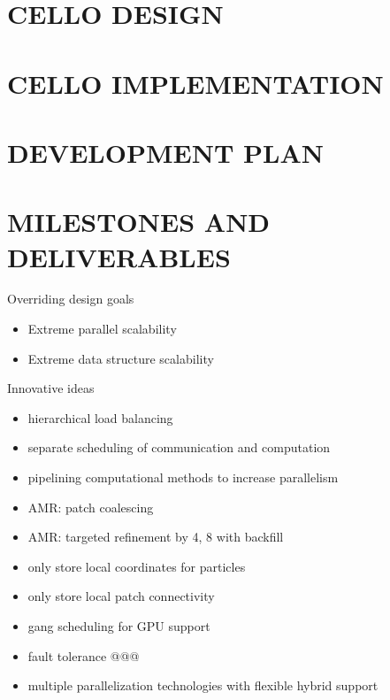 \documentclass[14pt,letter]{article}
\begin{document}
\section{CELLO DESIGN} \label{s:design}

\section{CELLO IMPLEMENTATION} \label{s:implementation}

%   
\section{DEVELOPMENT PLAN} \label{s:plan}

% 
\section{MILESTONES AND DELIVERABLES} \label{s:milestones}
%
%   

Overriding design goals
\begin{itemize}
\item Extreme parallel scalability
\item Extreme data structure scalability
\end{itemize}

Innovative ideas
\begin{itemize}
\item hierarchical load balancing
\item separate scheduling of communication and computation
\item pipelining computational methods to increase parallelism
\item AMR: patch coalescing
\item AMR: targeted refinement by 4, 8 with backfill
\item only store local coordinates for particles
\item only store local patch connectivity
\item gang scheduling for GPU support
\item fault tolerance @@@
\item multiple parallelization technologies with flexible hybrid support
\end{itemize}
\end{document}
